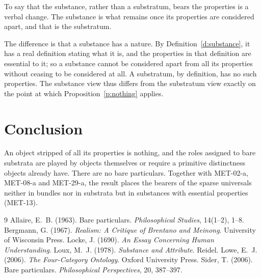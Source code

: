 \documentclass{situationist-preprint}
\begin{document}
\begin{objection}
To say that the substance, rather than a substratum, bears the properties is a verbal change. The substance is what remains once its properties are considered apart, and that is the substratum.
\end{objection}

\begin{reply}
The difference is that a substance has a nature. By Definition~\ref{d:substance}, it has a real definition stating what it is, and the properties in that definition are essential to it; so a substance cannot be considered apart from all its properties without ceasing to be considered at all. A substratum, by definition, has no such properties. The substance view thus differs from the substratum view exactly on the point at which Proposition~\ref{p:nothing} applies.
\end{reply}

\section{Conclusion}

An object stripped of all its properties is nothing, and the roles assigned to bare substrata are played by objects themselves or require a primitive distinctness objects already have. There are no bare particulars. Together with MET-02-a, MET-08-a and MET-29-a, the result places the bearers of the sparse universals neither in bundles nor in substrata but in substances with essential properties (MET-13).

\begin{thebibliography}{9}\small
{} Allaire, E.~B. (1963). Bare particulars. \emph{Philosophical Studies}, 14(1--2), 1--8.
 Bergmann, G. (1967). \emph{Realism: A Critique of Brentano and Meinong}. University of Wisconsin Press.
 Locke, J. (1690). \emph{An Essay Concerning Human Understanding}.
 Loux, M.~J. (1978). \emph{Substance and Attribute}. Reidel.
 Lowe, E.~J. (2006). \emph{The Four-Category Ontology}. Oxford University Press.
 Sider, T. (2006). Bare particulars. \emph{Philosophical Perspectives}, 20, 387--397.
\end{thebibliography}
\end{document}
